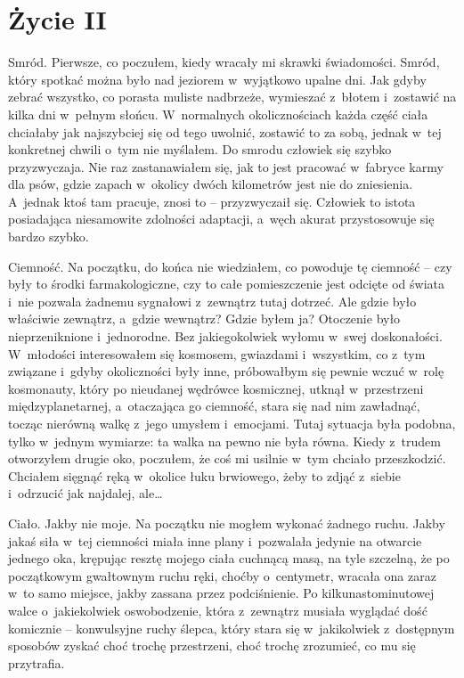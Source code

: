 \chapter{Życie II}

Smród. Pierwsze, co poczułem, kiedy wracały mi skrawki świadomości. Smród, który spotkać można było nad jeziorem w~wyjątkowo upalne dni. Jak gdyby zebrać wszystko, co porasta muliste nadbrzeże, wymieszać z~błotem i~zostawić na kilka dni w~pełnym słońcu. W~normalnych okolicznościach każda część ciała chciałaby jak najszybciej się od tego uwolnić, zostawić to za sobą, jednak w~tej konkretnej chwili o~tym nie myślałem. Do smrodu człowiek się szybko przyzwyczaja. Nie raz zastanawiałem się, jak to jest pracować w~fabryce karmy dla psów, gdzie zapach w~okolicy dwóch kilometrów jest nie do zniesienia. A~jednak ktoś tam pracuje, znosi to -- przyzwyczaił się. Człowiek to istota posiadająca niesamowite zdolności adaptacji, a~węch akurat przystosowuje się bardzo szybko.

Ciemność. Na początku, do końca nie wiedziałem, co powoduje tę ciemność -- czy były to środki farmakologiczne, czy to całe pomieszczenie jest odcięte od świata i~nie pozwala żadnemu sygnałowi z~zewnątrz tutaj dotrzeć. Ale gdzie było właściwie zewnątrz, a~gdzie wewnątrz? Gdzie byłem ja? Otoczenie było nieprzeniknione i~jednorodne. Bez jakiegokolwiek wyłomu w~swej doskonałości. W~młodości interesowałem się kosmosem, gwiazdami i~wszystkim, co z~tym związane i~gdyby okoliczności były inne, próbowałbym się pewnie wczuć w~rolę kosmonauty, który po nieudanej wędrówce kosmicznej, utknął w~przestrzeni międzyplanetarnej, a~otaczająca go ciemność, stara się nad nim zawładnąć, tocząc nierówną walkę z~jego umysłem i~emocjami. Tutaj sytuacja była podobna, tylko w~jednym wymiarze: ta walka na pewno nie była równa. Kiedy z~trudem otworzyłem drugie oko, poczułem, że coś mi usilnie w~tym chciało przeszkodzić. Chciałem sięgnąć ręką w~okolice łuku brwiowego, żeby to zdjąć z~siebie i~odrzucić jak najdalej, ale…

Ciało. Jakby nie moje. Na początku nie mogłem wykonać żadnego ruchu. Jakby jakaś siła w~tej ciemności miała inne plany i~pozwalała jedynie na otwarcie jednego oka, krępując resztę mojego ciała cuchnącą masą, na tyle szczelną, że po początkowym gwałtownym ruchu ręki, choćby o~centymetr, wracała ona zaraz w~to samo miejsce, jakby zassana przez podciśnienie. Po kilkunastominutowej walce o~jakiekolwiek oswobodzenie, która z~zewnątrz musiała wyglądać dość komicznie -- konwulsyjne ruchy ślepca, który stara się w~jakikolwiek z~dostępnym sposobów zyskać choć trochę przestrzeni, choć trochę zrozumieć, co mu się przytrafia. 

